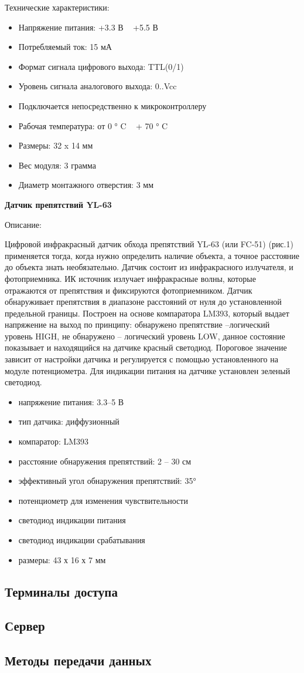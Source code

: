 Технические характеристики:
\begin{itemize}
    \itemsep0em
    \item Напряжение питания: +3.3 В ~ +5.5 В
    \item Потребляемый ток: 15 мА
    \item Формат сигнала цифрового выхода: TTL(0/1)
    \item Уровень сигнала аналогового выхода: 0..Vcc
    \item Подключается непосредственно к микроконтроллеру
    \item Рабочая температура: от 0 ° C ~ + 70 ° C
    \item Размеры: 32 x 14 мм
    \item Вес модуля: 3 грамма
    \item Диаметр монтажного отверстия: 3 мм
\end{itemize}


\textbf{Датчик препятствий YL-63}

Описание:

Цифровой инфракрасный датчик обхода препятствий YL-63 (или FC-51) (рис.1) применяется тогда, когда нужно определить наличие объекта, а точное расстояние до объекта знать необязательно.
Датчик состоит из инфракрасного излучателя, и фотоприемника.
ИК источник излучает инфракрасные волны, которые отражаются от препятствия и фиксируются фотоприемником.
Датчик обнаруживает препятствия в диапазоне расстояний от нуля до установленной предельной границы.
Построен на основе компаратора LM393, который выдает напряжение на выход по принципу: обнаружено препятствие –логический уровень HIGH, не обнаружено – логический уровень LOW, данное состояние показывает и находящийся на датчике красный светодиод.
Пороговое значение зависит от настройки датчика и регулируется с помощью установленного на модуле потенциометра.
Для индикации питания на датчике установлен зеленый светодиод.

\begin{itemize}
    \itemsep0em
    \item напряжение питания: 3.3–5 В
    \item тип датчика: диффузионный
    \item компаратор: LM393
    \item расстояние обнаружения препятствий: 2 – 30 см
    \item эффективный угол обнаружения препятствий: 35°
    \item потенциометр для изменения чувствительности
    \item светодиод индикации питания
    \item светодиод индикации срабатывания
    \item размеры: 43 х 16 х 7 мм
\end{itemize}





\subsection{Терминалы доступа}

\subsection{Сервер}

\subsection{Методы передачи данных}
